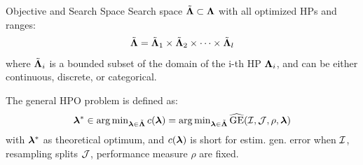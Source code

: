 \documentclass[11pt,compress,t,notes=noshow, xcolor=table]{beamer}
\begin{document}
\begin{vbframe}{Objective and Search Space}
Search space $\tilde{\bm{\Lambda}} \subset \bm{\Lambda}$ with all optimized HPs and ranges:
$$\tilde{\bm{\Lambda}} = \tilde{\bm{\Lambda}}_1 \times \tilde{\bm{\Lambda}}_2 \times \dots \times \tilde{\bm{\Lambda}}_l$$
 where $\tilde{\bm{\Lambda}}_i$ is a bounded subset of the domain of the i-th HP $\bm{\Lambda}_i$, and can be either continuous, discrete, or categorical. 


\vspace{1cm}

The general HPO problem is defined as:
\begin{eqnarray*}
    \bm{\lambda}^{*} \in \operatorname{arg\,min}_{\bm{\lambda} \in \tilde{\bm{\Lambda}}} c(\bm{\lambda}) = \operatorname{arg\,min}_{\bm{\lambda} \in \tilde{\bm{\Lambda}}} 
    \widehat{\mathrm{GE}}(\mathcal{I}, \mathcal{J}, \rho, \bm{\lambda})
\end{eqnarray*}
with $\bm{\lambda}^{*}$ as theoretical optimum, and $c(\bm{\lambda})$ is short for estim. gen. error
when $\mathcal{I}$, resampling splits $\mathcal{J}$, performance measure $\rho$ are fixed.
\end{vbframe}

\end{document}
